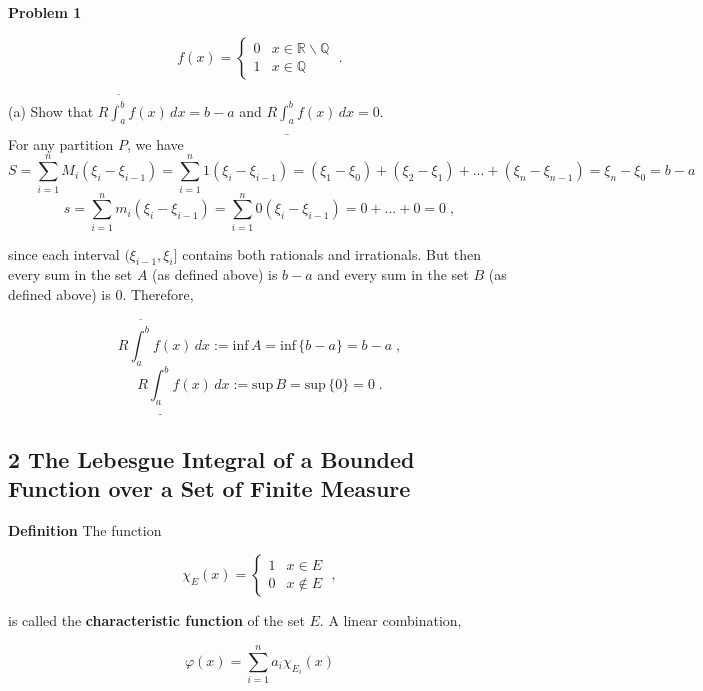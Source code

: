 \documentclass[a4paper]{article}
\begin{document}
{\bf Problem 1}

$$f(x) = \begin{cases}
0 & x \in \mathbb{R}\backslash \mathbb{Q} \\
1 & x \in \mathbb{Q}
\end{cases} \;. $$

(a) Show that $R\overline{\int_a^b} f(x) \, dx = b-a$ and $R\underline{\int_a^b} f(x) \, dx = 0$.\\

For any partition $P$, we have $$S = \sum_{i=1}^n M_i(\xi_{i} - \xi_{i-1}) =  \sum_{i=1}^n 1(\xi_{i} - \xi_{i-1}) = (\xi_1 - \xi_0) + (\xi_2 - \xi_1) +... + (\xi_n - \xi_{n-1}) = \xi_n - \xi_0 = b-a$$
$$s = \sum_{i=1}^n  m_i(\xi_{i} - \xi_{i-1}) =  \sum_{i=1}^n 0(\xi_{i} - \xi_{i-1}) = 0 +... + 0 = 0 \;,$$

since each interval $(\xi_{i-1}, \xi_i]$ contains both rationals and irrationals. But then every sum in the set $A$ (as defined above) is $b-a$ and every sum in the set $B$ (as defined above) is 0. Therefore, 

$$R\overline{\int_a^b} f(x) \, dx := \text{inf} \, A = \text{inf} \, \{b-a \} = b-a \;,$$
$$R\underline{\int_a^b} f(x) \, dx := \text{sup} \, B = \text{sup} \, \{0\} = 0 \;.$$


\subsection*{2 The Lebesgue Integral of a Bounded Function over a Set of Finite Measure}

{\bf Definition} The function 

$$ \chi_E(x) = \begin{cases}
1 & x \in E\\ 0 & x \not\in E \end{cases} \;, $$

is called the {\bf characteristic function} of the set $E$. A linear combination,

$$\varphi(x) = \sum_{i=1}^n a_i \chi_{E_i}(x) $$
\end{document}
